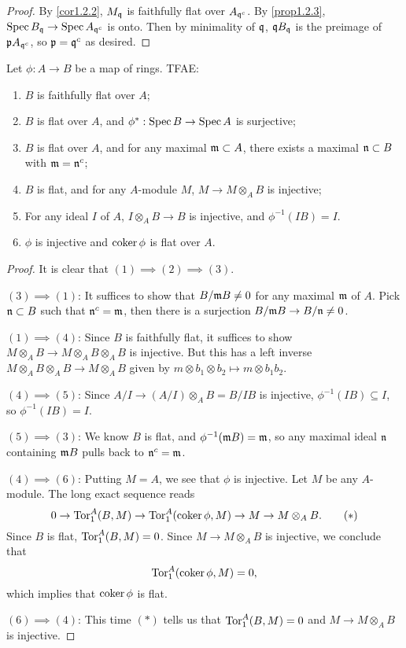 \documentclass[11pt]{amsart}
\begin{document}
\begin{proof}
    By \ref{cor1.2.2}, $M_{\mathfrak{q}}$ is faithfully flat over $A_{\mathfrak{q}^c}$. By \ref{prop1.2.3}, $\operatorname{Spec} B_{\mathfrak{q}} \to \operatorname{Spec} A_{\mathfrak{q}^c}$ is onto. Then by minimality of $\mathfrak{q}$, $\mathfrak{q} B_{\mathfrak{q}}$ is the preimage of $\mathfrak{p} A_{\mathfrak{q}^c}$, so $\mathfrak{p} = \mathfrak{q}^c$ as desired.
\end{proof}


\begin{prop}
    Let $\phi:A\to B$ be a map of rings. TFAE:
    \begin{enumerate}
        \item $B$ is faithfully flat over $A$;
        \item $B$ is flat over $A$, and $\phi^*: \operatorname{Spec} B\to \operatorname{Spec} A$ is surjective;
        \item $B$ is flat over $A$, and for any maximal $\mathfrak{m}\subset A$, there exists a maximal $\mathfrak{n}\subset B$ with $\mathfrak{m} = \mathfrak{n}^c$;
        \item $B$ is flat, and for any $A$-module $M$, $M\to M\otimes_A B$ is injective;
        \item For any ideal $I$ of $A$, $I\otimes_A B \to B$ is injective, and $\phi^{-1}(IB) = I$.
        \item $\phi$ is injective and $\operatorname{coker} \phi$ is flat over $A$.
    \end{enumerate}
\end{prop}

\begin{proof}
It is clear that $(1)\implies (2)\implies (3)$.

$(3)\implies (1)$: It suffices to show that $B/\mathfrak{m} B \neq 0$ for any maximal $\mathfrak{m}$ of $A$. Pick $\mathfrak{n}\subset B$ such that $\mathfrak{n}^c = \mathfrak{m}$, then there is a surjection $B/\mathfrak{m} B \to B/\mathfrak{n}\neq 0$.

$(1)\implies (4)$: Since $B$ is faithfully flat, it suffices to show $M\otimes_A B \to M\otimes_A B \otimes_A B$ is injective. But this has a left inverse $M\otimes_A B \otimes_A B \to M\otimes_A B$ given by $m\otimes b_1\otimes b_2 \mapsto m\otimes b_1b_2$.

$(4)\implies (5)$: Since $A/I \to (A/I)\otimes_A B = B/IB$ is injective, $\phi^{-1}(IB) \subseteq I$, so $\phi^{-1}(IB) = I$.

$(5)\implies (3)$: We know $B$ is flat, and $\phi^{-1}(\mathfrak{m} B) = \mathfrak{m}$, so any maximal ideal $\mathfrak{n}$ containing $\mathfrak{m} B$ pulls back to $\mathfrak{n}^c = \mathfrak{m}$.

$(4)\implies (6)$: Putting $M = A$, we see that $\phi$ is injective. Let $M$ be any $A$-module. The long exact sequence reads
\[0\to \operatorname{Tor}_1^A(B,M) \to \operatorname{Tor}_1^A(\operatorname{coker} \phi, M)\to M\to M\otimes_A B. \tag{$\ast$}\]
Since $B$ is flat, $\operatorname{Tor}_1^A(B,M) = 0$. Since $M\to M\otimes_A B$ is injective, we conclude that
\[\operatorname{Tor}_1^A(\operatorname{coker} \phi,M) = 0,\]
which implies that $\operatorname{coker}\phi$ is flat.

$(6)\implies (4)$: This time $(\ast)$ tells us that $\operatorname{Tor}_1^A(B,M)=0$ and $M\to M\otimes_A B$ is injective.
\end{proof}
\end{document}
